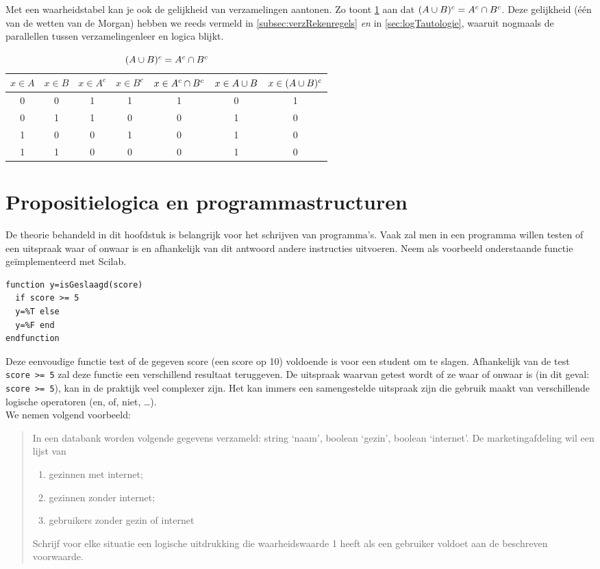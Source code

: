 Met een waarheidstabel kan je ook de gelijkheid van verzamelingen aantonen. Zo toont \cref{tbl:gelijkeVerzamelingen} aan dat $(A\cup B)^c=A^c\cap B^c$. Deze gelijkheid (één van de wetten van de Morgan) hebben we reeds vermeld in \cref{subsec:verzRekenregels} \emph{en} in \cref{sec:logTautologie}, waaruit nogmaals de parallellen tussen verzamelingenleer en logica blijkt. 


\begin{table}
\caption{$(A \cup B)^c=A^c \cap B^c$} \label{tbl:gelijkeVerzamelingen}
\begin{tabular}{ccccccc}
\toprule
$x\in A$ & $x\in B$ & $x\in A^c$ & $x\in B^c$ & $x\in A^c\cap B^c$ & $x\in A \cup B$ & $x\in (A \cup B)^c$ \\ 
\midrule
0 & 0 & 1 & 1 & 1 & 0 & 1 \\ 
0 & 1 & 1 & 0 & 0 & 1 & 0 \\ 
1 & 0 & 0 & 1 & 0 & 1 & 0 \\ 
1 & 1 & 0 & 0 & 0 & 1 & 0 \\ 
\bottomrule
\end{tabular} 
\end{table}

\section{Propositielogica en programmastructuren}

De theorie behandeld in dit hoofdstuk is belangrijk voor het schrijven van programma’s. Vaak zal men in een programma willen testen of een uitspraak waar of onwaar is en afhankelijk van dit antwoord andere instructies uitvoeren.
Neem als voorbeeld onderstaande functie geïmplementeerd met Scilab.
\begin{lstlisting}
function y=isGeslaagd(score) 
  if score >= 5
  y=%T else
  y=%F end
endfunction
\end{lstlisting}
Deze eenvoudige functie test of de gegeven score (een score op 10) voldoende is voor een student om te slagen. Afhankelijk van de test \verb+score >= 5+ zal deze functie een verschillend resultaat teruggeven. De uitspraak waarvan getest wordt of ze waar of onwaar is (in dit geval: \verb+score >= 5+), kan in de praktijk veel complexer zijn. Het kan immers een samengestelde uitspraak zijn die gebruik maakt van verschillende logische operatoren (en, of, niet, \dots).\\

We nemen volgend voorbeeld:
\begin{quote}
In een databank worden volgende gegevens verzameld: string `naam', boolean `gezin', boolean `internet'. De marketingafdeling wil een lijst van 
\begin{enumerate}
\item gezinnen met internet;
\item gezinnen zonder internet;
\item gebruikers zonder gezin of internet
\end{enumerate}
Schrijf voor elke situatie een logische uitdrukking die waarheidswaarde 1 heeft als een gebruiker voldoet aan de beschreven voorwaarde.
\end{quote}


